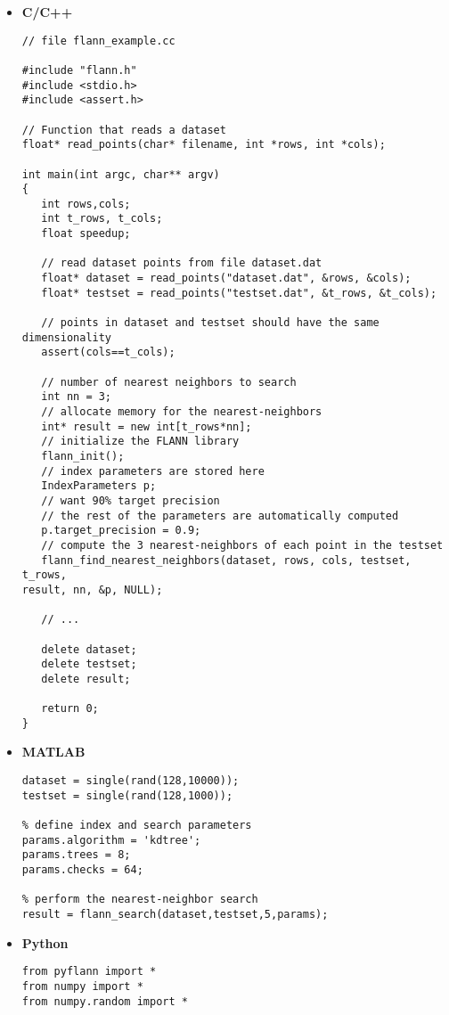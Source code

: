 \documentclass[letter,10pt]{article}
\begin{document}
\begin{itemize}

\item \textbf{C/C++}
\begin{Verbatim}[fontsize=\scriptsize,frame=single]
// file flann_example.cc

#include "flann.h"
#include <stdio.h>
#include <assert.h>

// Function that reads a dataset
float* read_points(char* filename, int *rows, int *cols);

int main(int argc, char** argv)
{
   int rows,cols;
   int t_rows, t_cols;
   float speedup;

   // read dataset points from file dataset.dat
   float* dataset = read_points("dataset.dat", &rows, &cols);
   float* testset = read_points("testset.dat", &t_rows, &t_cols);

   // points in dataset and testset should have the same dimensionality
   assert(cols==t_cols);

   // number of nearest neighbors to search
   int nn = 3;
   // allocate memory for the nearest-neighbors
   int* result = new int[t_rows*nn];
   // initialize the FLANN library
   flann_init();  
   // index parameters are stored here
   IndexParameters p;
   // want 90% target precision
   // the rest of the parameters are automatically computed
   p.target_precision = 0.9;  
   // compute the 3 nearest-neighbors of each point in the testset
   flann_find_nearest_neighbors(dataset, rows, cols, testset, t_rows,
result, nn, &p, NULL);

   // ...

   delete dataset;
   delete testset;
   delete result;

   return 0;
}

\end{Verbatim}



\item \textbf{MATLAB}
\begin{Verbatim}[fontsize=\scriptsize,frame=single]
% create random dataset and test set
dataset = single(rand(128,10000));
testset = single(rand(128,1000));

% define index and search parameters
params.algorithm = 'kdtree';
params.trees = 8;
params.checks = 64;

% perform the nearest-neighbor search
result = flann_search(dataset,testset,5,params);
\end{Verbatim}

\item \textbf{Python}
\begin{Verbatim}[fontsize=\scriptsize,frame=single]
from pyflann import *
from numpy import *
from numpy.random import *


\end{Verbatim}
\end{itemize}
\end{document}
